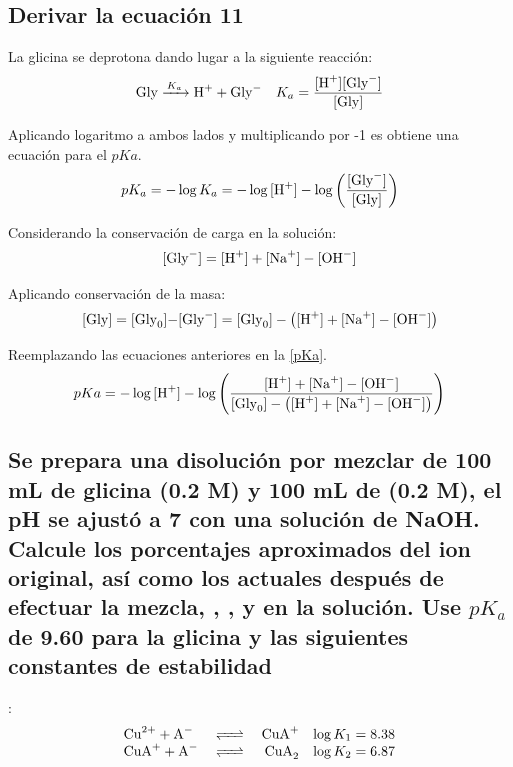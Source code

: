 \documentclass[fleqn,10pt]{SelfArx} %
\begin{document}
	\subsubsection{}
	
	\subsection{Derivar la ecuaci\'on 11}
	La glicina se deprotona dando lugar a la siguiente reacci\'on:
	\begin{equation}\label{Ka}
	\begin{array}{lr}
	\ce{Gly ->[K_a] H+ + Gly^-} & K_a = \dfrac{\ce{[H+][Gly^-]}}{\ce{[Gly]}}
	\end{array}
	\end{equation}
	
	Aplicando logaritmo a ambos lados y multiplicando por -1 es obtiene una ecuaci\'on para el $pKa$.
	\begin{equation}\label{pKa}
	pK_a = -\log K_a = -\log\ce{[H+]} - \log\left(\dfrac{\ce{[Gly^-]}}{\ce{[Gly]}}\right)
	\end{equation}
	
	Considerando la conservaci\'on de carga en la soluci\'on:
	\begin{equation}
		\ce{[Gly^-]} = \ce{[H+] + [Na+] - [OH^-]}
	\end{equation}
	
	Aplicando conservaci\'on de la masa:
	\footnotesize
	\begin{equation}
		\ce{[Gly]} = \ce{[Gly_0]-[Gly^-]} = \ce{[Gly_0]} - \left(\ce{[H+] + [Na+] - [OH^-]}\right)
	\end{equation}
	\normalsize
	
	\small
	Reemplazando las ecuaciones anteriores en la \autoref{pKa}.	
	\begin{equation*}
		pKa = -\log\ce{[H+]} - \log\left(\dfrac{\ce{[H+] + [Na+] - [OH^-]}}{\ce{[Gly_0]} - \left(\ce{[H+] + [Na+] - [OH^-]}\right)}\right)
	\end{equation*}
	\normalsize
	
	\subsection[Se prepara]{Se prepara una disoluci\'on por mezclar de 100 mL de glicina (0.2 M) y 100 mL de  (0.2 M), el pH se ajust\'o a 7 con una soluci\'on de NaOH. Calcule los porcentajes aproximados del ion  original, as\'i como los actuales despu\'es de efectuar la mezcla, , , y  en la soluci\'on. Use $pK_a$ de 9.60 para la glicina y las siguientes constantes de estabilidad}:
	\begin{equation*}
	    \begin{array}{lcrc}
	        \ce{Cu^{2+} + A-} & \ce{<=>} & \ce{CuA+} & \log K_1 = 8.38\\
	        \ce{CuA+ + A-} & \ce{<=>} & \ce{CuA_2} & \log K_2 = 6.87 
	    \end{array}
	\end{equation*}
	
\end{document}
